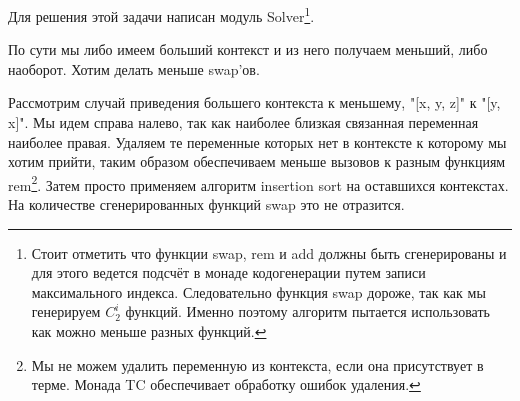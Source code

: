 Для решения этой задачи написан модуль Solver\footnote{Стоит отметить что функции swap, rem и add должны быть сгенерированы и для этого ведется подсчёт в монаде кодогенерации путем записи максимального индекса. Следовательно функция swap дороже, так как мы генерируем $C_2^i$ функций. Именно поэтому алгоритм пытается использовать как можно меньше разных функций.}.

По сути мы либо имеем больший контекст и из него получаем меньший, либо наоборот. Хотим делать меньше swap'ов.

Рассмотрим случай приведения большего контекста к меньшему, "[x, y, z]" к "[y, x]". Мы идем справа налево, так как наиболее близкая связанная переменная наиболее правая. Удаляем те переменные которых нет в контексте к которому мы хотим прийти, таким образом обеспечиваем меньше вызовов к разным функциям rem\footnote{Мы не можем удалить переменную из контекста, если она присутствует в терме. Монада TC обеспечивает обработку ошибок удаления.}. Затем просто применяем алгоритм insertion sort на оставшихся контекстах. На количестве сгенерированных функций swap это не отразится.







